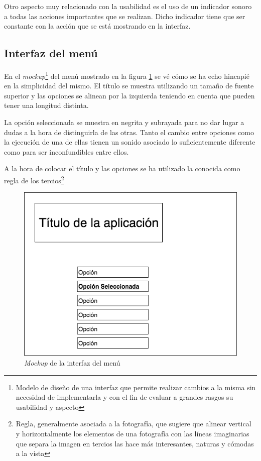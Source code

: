 \bigskip

Otro aspecto muy relacionado con la usabilidad es el uso de un indicador sonoro a todas las acciones importantes que se realizan. Dicho indicador tiene que ser constante con la acción que se está mostrando en la interfaz.

\subsection{Interfaz del menú}

En el \textit{mockup}\footnote{Modelo de diseño de una interfaz que permite realizar cambios a la misma sin necesidad de implementarla y con el fin de evaluar a grandes rasgos su usabilidad y aspecto} del menú mostrado en la figura \ref{inter:menu} se vé cómo se ha echo hincapié en la simplicidad del mismo. El título se muestra utilizando un tamaño de fuente superior y las opciones se alinean por la izquierda teniendo en cuenta que pueden tener una longitud distinta.

\bigskip

La opción seleccionada se muestra en negrita y subrayada para no dar lugar a dudas a la hora de distinguirla de las otras. Tanto el cambio entre opciones como la ejecución de una de ellas tienen un sonido asociado lo suficientemente diferente como para ser inconfundibles entre ellos.

\bigskip A la hora de colocar el título y las opciones se ha utilizado la conocida como regla de los tercios\footnote{Regla, generalmente asociada a la fotografía, que sugiere que alinear vertical y horizontalmente los elementos de una fotografía con las líneas imaginarias que separa la imagen en tercios las hace más interesantes, naturas y cómodas a la vista}

\begin{figure}
	\centerline{\includegraphics[width=12cm]{otros/graphicalInterface/menu.png}}
	\caption{\textit{Mockup} de la interfaz del menú}
	\label{inter:menu}
\end{figure}

